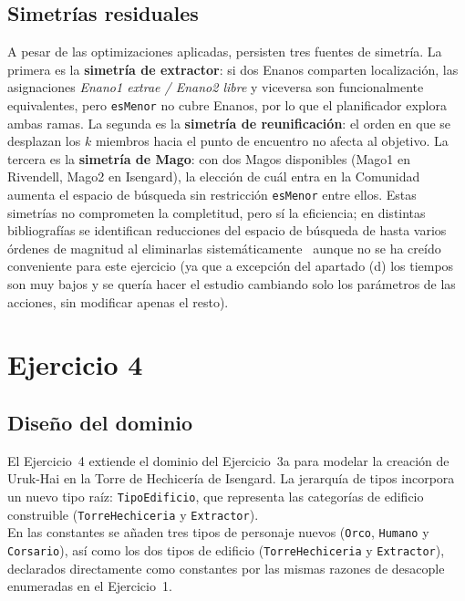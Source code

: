 \documentclass[10pt]{article}
\begin{document}
\subsection{Simetrías residuales}

A pesar de las optimizaciones aplicadas, persisten tres fuentes de simetría. La primera es la \textbf{simetría de extractor}: si dos Enanos comparten localización, las asignaciones \textit{Enano1 extrae / Enano2 libre} y viceversa son funcionalmente equivalentes, pero \texttt{esMenor} no cubre Enanos, por lo que el planificador explora ambas ramas. La segunda es la \textbf{simetría de reunificación}: el orden en que se desplazan los $k$ miembros hacia el punto de encuentro no afecta al objetivo. La tercera es la \textbf{simetría de Mago}: con dos Magos disponibles (Mago1 en Rivendell, Mago2 en Isengard), la elección de cuál entra en la Comunidad aumenta el espacio de búsqueda sin restricción \texttt{esMenor} entre ellos. Estas simetrías no comprometen la completitud, pero sí la eficiencia; en distintas bibliografías se identifican reducciones del espacio de búsqueda de hasta varios órdenes de magnitud al eliminarlas sistemáticamente~\cite{shleyfman2015} aunque no se ha creído conveniente para este ejercicio (ya que a excepción del apartado (d) los tiempos son muy bajos y se quería hacer el estudio cambiando solo los parámetros de las acciones, sin modificar apenas el resto).

\section{Ejercicio 4}
 
\subsection{Diseño del dominio}
 
El Ejercicio~4 extiende el dominio del Ejercicio~3a para modelar la creación de Uruk-Hai en la Torre de Hechicería de Isengard. La jerarquía de tipos incorpora un nuevo tipo raíz: \texttt{TipoEdificio}, que representa las categorías de edificio construible (\texttt{TorreHechiceria} y \texttt{Extractor}).\\
 
En las constantes se añaden tres tipos de personaje nuevos (\texttt{Orco}, \texttt{Humano} y \texttt{Corsario}), así como los dos tipos de edificio (\texttt{TorreHechiceria} y \texttt{Extractor}), declarados directamente como constantes por las mismas razones de desacople enumeradas en el Ejercicio~1.\\
 
\end{document}
